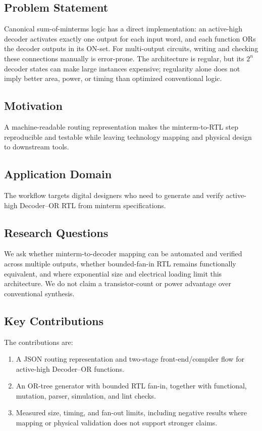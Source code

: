 \documentclass[runningheads]{llncs}
\begin{document}
\subsection{Problem Statement}
Canonical sum-of-minterms logic has a direct implementation: an active-high decoder activates exactly one output for each input word, and each function ORs the decoder outputs in its ON-set. For multi-output circuits, writing and checking these connections manually is error-prone. The architecture is regular, but its $2^n$ decoder states can make large instances expensive; regularity alone does not imply better area, power, or timing than optimized conventional logic.

\subsection{Motivation}
A machine-readable routing representation makes the minterm-to-RTL step reproducible and testable while leaving technology mapping and physical design to downstream tools.

\subsection{Application Domain}
The workflow targets digital designers who need to generate and verify active-high Decoder--OR RTL from minterm specifications.

\subsection{Research Questions}
We ask whether minterm-to-decoder mapping can be automated and verified across multiple outputs, whether bounded-fan-in RTL remains functionally equivalent, and where exponential size and electrical loading limit this architecture. We do not claim a transistor-count or power advantage over conventional synthesis.

\subsection{Key Contributions}
The contributions are:
\begin{enumerate}
    \item A JSON routing representation and two-stage front-end/compiler flow for active-high Decoder--OR functions.
    \item An OR-tree generator with bounded RTL fan-in, together with functional, mutation, parser, simulation, and lint checks.
    \item Measured size, timing, and fan-out limits, including negative results where mapping or physical validation does not support stronger claims.
\end{enumerate}
\end{document}
